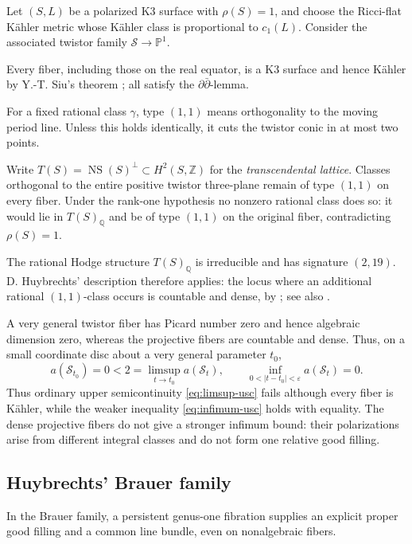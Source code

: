 \documentclass[11pt]{amsart}
\numberwithin{equation}{section}
\theoremstyle{plain}
\theoremstyle{definition}
\newcommand{\Z}{\mathbb Z}
\newcommand{\Q}{\mathbb Q}
\begin{document}
Let $(S,L)$ be a polarized K3 surface with $\rho(S)=1$, and choose the
Ricci-flat K\"ahler metric whose K\"ahler class is proportional to
$c_1(L)$.  Consider the associated twistor family
$\mathscr S\to\mathbb P^1$.

Every fiber, including those on the real equator, is a K3 surface and
hence K\"ahler by Y.-T. Siu's theorem \cite[Main Theorem]{Si83}; all satisfy the
$\partial\bar\partial$-lemma.

For a fixed rational class $\gamma$, type $(1,1)$ means orthogonality to
the moving period line.  Unless this holds identically, it cuts the
twistor conic in at most two points.

Write $T(S)=\operatorname{NS}(S)^\perp\subset H^2(S,\Z)$ for the
\emph{transcendental lattice}.
Classes orthogonal to the entire positive twistor three-plane remain of
type $(1,1)$ on every fiber.  Under the rank-one hypothesis no nonzero
rational class does so: it would lie in $T(S)_\Q$ and be of type
$(1,1)$ on the original fiber, contradicting $\rho(S)=1$.

The rational Hodge structure $T(S)_\Q$ is irreducible and has signature
$(2,19)$.  D. Huybrechts' description therefore applies: the locus where an
additional rational $(1,1)$-class occurs is countable and dense, by
\cite[Introduction and Proposition~3.2]{Hu22}; see also
\cite[\S~1.3]{Hu23}.

A very general twistor fiber has Picard number zero and hence algebraic
dimension zero, whereas the projective fibers are countable and dense.
Thus, on a small coordinate disc about a very general parameter $t_0$,
\begin{equation*}
 a(\mathscr S_{t_0})=0
 <2=\limsup_{t\to t_0}a(\mathscr S_t),
 \qquad
 \inf_{0<|t-t_0|<\varepsilon}a(\mathscr S_t)=0.
\end{equation*}
Thus ordinary upper semicontinuity \eqref{eq:limsup-usc} fails although
every fiber is K\"ahler, while the weaker inequality
\eqref{eq:infimum-usc} holds with equality.  The dense projective fibers
do not give a stronger infimum bound: their polarizations arise from
different integral classes and do not form one relative good filling.

\subsection{Huybrechts' Brauer family}
\label{ss:brauer-family}

In the Brauer family, a persistent genus-one fibration supplies an
explicit proper good filling and a common line bundle, even on
nonalgebraic fibers.
\end{document}
